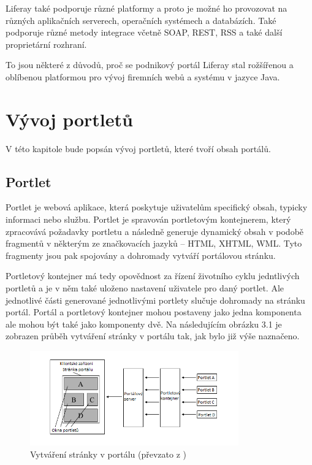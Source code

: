 \documentclass{fithesis}
\begin{document}
Liferay také podporuje různé platformy a proto je možné ho provozovat na různých aplikačních serverech, operačních systémech a databázích. Také podporuje různé metody integrace včetně SOAP, REST, RSS a také další proprietární rozhraní.\cite{liferay-features}

To jsou některé z důvodů, proč se podnikový portál Liferay stal rožšířenou a oblíbenou platformou pro vývoj firemních webů a systému v jazyce Java.















\chapter{Vývoj portletů}
V této kapitole bude popsán vývoj portletů, které tvoří obsah portálů.

\section{Portlet}
Portlet je webová aplikace, která poskytuje uživatelům specifický obsah, typicky informaci nebo službu. Portlet je spravován portletovým kontejnerem, který zpracovává požadavky portletu a následně generuje dynamický obsah v podobě fragmentů v některým ze značkovacích jazyků -- HTML, XHTML, WML.  Tyto fragmenty jsou pak spojovány a dohromady vytváří portálovou stránku.

Portletový kontejner má tedy opovědnost za řízení životního cyklu jedntlivých portletů a je v něm také uloženo nastavení uživatele pro daný portlet. Ale jednotlivé části generované jednotlivými portlety slučuje dohromady na stránku portál. Portál a portletový kontejner mohou postaveny jako jedna komponenta ale mohou být také jako komponenty dvě. Na následujícím obrázku 3.1 je zobrazen průběh vytváření stránky v portálu tak, jak bylo již výše naznačeno.

\begin{figure}[htp]
\centering
\includegraphics[width=340px]{images/vytvareni_stranky_v_portalu.png}
\caption{Vytváření stránky v portálu (převzato z \cite{jsr-286})}
\end{figure}
\end{document}
